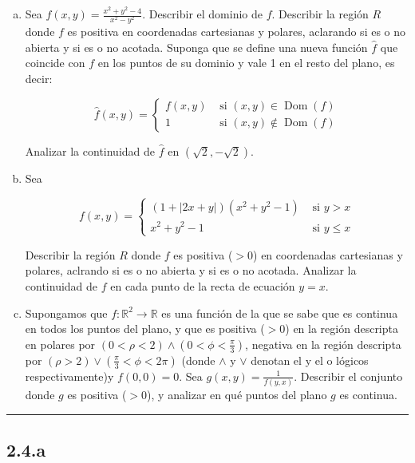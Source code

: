 \documentclass{article}
\renewcommand{\Bbb}{\mathbb}
\begin{document}
\begin{enumerate}[(a)]
\bfseries
\item Sea $f(x,y) = \frac{x^2 + y^2 -4}{x^2 - y^2}$. Describir el dominio de $f$. Describir la región $R$ donde $f$ es positiva en coordenadas cartesianas y polares, aclarando si es o no abierta y si es o no acotada. Suponga que se define una nueva función $\hat{f}$ que coincide con $f$ en los puntos de su dominio y vale 1 en el resto del plano, es decir:

\begin{equation}
\hat{f}(x,y) = \left\{ \begin{array}{ll}
f(x,y) &\text{ si } (x,y) \in \mathop{Dom}(f) \\
1 & \text{ si } (x,y) \notin \mathop{Dom}(f)
\end{array}
\right.
\end{equation}

Analizar la continuidad de $\hat{f}$ en $(\sqrt{2}, -\sqrt{2})$.

\item Sea

\begin{equation}
f(x,y) = \left\{ \begin{array}{ll}
(1 + |2x+y|) (x^2 + y^2 -1) &\text{ si } y > x \\
x^2 + y^2 - 1 & \text{ si } y \leq x
\end{array}
\right.
\end{equation}

Describir la región $R$ donde $f$ es positiva ($> 0$) en coordenadas cartesianas y polares, aclrando si es o no abierta y si es o no acotada. Analizar la continuidad de $f$ en cada punto de la recta de ecuación $y = x$.

\item Supongamos que $f: \Bbb R^2 \rightarrow \Bbb R$ es una función de la que se sabe que es continua en todos los puntos del plano, y que es positiva ($> 0$) en la región descripta en polares por $(0 < \rho < 2) \wedge (0 < \phi < \frac{\pi}{3})$, negativa en la región descripta por $(\rho > 2) \vee (\frac{\pi}{3} < \phi < 2\pi)$ (donde $\wedge$ y $\vee$ denotan el y el o lógicos respectivamente)y $f(0,0) = 0$. Sea $g(x,y) = \frac{1}{f(y,x)}$. Describir el conjunto donde $g$ es positiva ($>0$), y analizar en qué puntos del plano $g$ es continua.

\end{enumerate}
\hrule

\subsection*{2.4.a}
\label{subsec:2.4.a}
\end{document}
